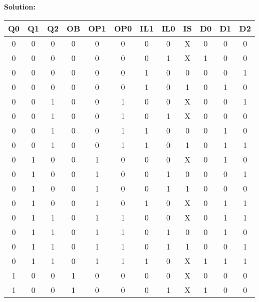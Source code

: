 \textbf{Solution:}

\begin{table}[H]
    \centering
    \begin{tabular}{|c|c|c|c|c|c|c|c|c|c|c|c|}
        \hline
        \textbf{Q0} & \textbf{Q1} & \textbf{Q2} & \textbf{OB} & \textbf{OP1} & \textbf{OP0} & \textbf{IL1} & \textbf{IL0} & \textbf{IS} & \textbf{D0} & \textbf{D1} & \textbf{D2} \\
        \hline
        0  & 0  & 0  & 0  & 0   & 0   & 0   & 0   & X  & 0  & 0  & 0  \\ \hline
        0  & 0  & 0  & 0  & 0   & 0   & 0   & 1   & X  & 1  & 0& 0\\ \hline
        0  & 0  & 0  & 0  & 0   & 0   & 1   & 0   & 0  & 0  & 0  & 1  \\ \hline
        0  & 0  & 0  & 0  & 0   & 0   & 1   & 0   & 1  & 0  & 1  & 0  \\ \hline
        0  & 0  & 1  & 0  & 0   & 1   & 0   & 0   & X  & 0  & 0  & 1  \\ \hline
        0  & 0  & 1  & 0  & 0   & 1   & 0   & 1   & X& 0  & 0  & 0  \\ \hline
        0  & 0  & 1  & 0  & 0   & 1   & 1   & 0   & 0  & 0  & 1  & 0  \\ \hline
        0  & 0  & 1  & 0  & 0   & 1   & 1   & 0   & 1  & 0  & 1  & 1  \\ \hline
        0  & 1  & 0  & 0  & 1   & 0   & 0   & 0   & X  & 0  & 1  & 0  \\ \hline
        0  & 1  & 0  & 0  & 1   & 0   & 0   & 1   & 0  & 0  & 0  & 1  \\ \hline
        0  & 1  & 0  & 0  & 1   & 0   & 0   & 1   & 1  & 0  & 0  & 0  \\ \hline
        0  & 1  & 0  & 0  & 1   & 0   & 1   & 0   & X& 0  & 1  & 1  \\ \hline
        0  & 1  & 1  & 0  & 1   & 1   & 0   & 0   & X  & 0  & 1  & 1  \\ \hline
        0  & 1  & 1  & 0  & 1   & 1   & 0   & 1   & 0  & 0  & 1  & 0  \\ \hline
        0  & 1  & 1  & 0  & 1   & 1   & 0   & 1   & 1  & 0  & 0  & 1  \\ \hline
        0  & 1  & 1  & 0  & 1   & 1   & 1   & 0   & X  & 1  & 1& 1\\ \hline
        1  & 0  & 0  & 1  & 0   & 0   & 0   & 0   & X  & 0  & 0& 0\\ \hline
        1  & 0  & 0  & 1  & 0& 0& 0   & 1   & X& 1& 0& 0  \\ \hline

\end{tabular}
\end{table}

